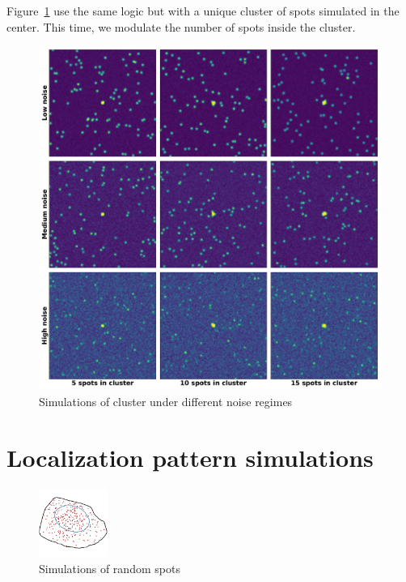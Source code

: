 \newpage

\null
\vfill

\noindent
Figure~\ref{fig:cluster_mosaic} use the same logic but with a unique cluster of spots simulated in the center.
This time, we modulate the number of spots inside the cluster.

\vfill

\begin{figure}[h]
    \centering
    \includegraphics[width=\textwidth]{figures/appendix/cluster_mosaic}
    \caption[Cluster simulations under different noise regimes]{Simulations of cluster under different noise regimes}
    \label{fig:cluster_mosaic}
\end{figure}

\newpage

\section{Localization pattern simulations}
\label{sec:appendix_simulations_pattern}

\vfill

\begin{figure}[h]
    \centering
    \includegraphics[width=0.2\textwidth]{figures/appendix/random_1_300}
    \caption[Random spot simulations]{Simulations of random spots}
    \label{fig:random_1_300}
\end{figure}

